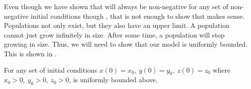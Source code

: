 Even though we have shown that  will always be non-negative for any set of non-negative initial conditions though , that is not enough to show that  makes sense. Populations not only exist, but they also have an upper limit. A population cannot just grow infinitely in size. After some time, a population will stop growing in size. Thus, we will need to show that our model is uniformly bounded. This is shown in .

\begin{theorem}\label{thm:bounded}
    For any set of initial conditions $x(0) = x_0,\ y(0) = y_0,\ z(0) = z_0$ where $x_0 > 0,\ y_0 > 0,\ z_0 > 0$,  is uniformly bounded above.
\end{theorem}
